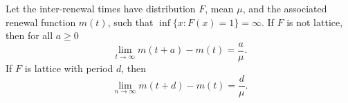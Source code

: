 \documentclass[a4paper,10pt,english]{article}
\begin{document}
\begin{thm} 
Let the inter-renewal times have distribution $F$, mean $\mu$, and the associated renewal function $m(t)$, such that $\inf\{x: F(x) = 1\} = \infty$. 
If $F$ is not lattice, then for all $a \geq 0$
\begin{equation*}
\lim_{t \to \infty} m(t+a) -m(t) = \frac{a}{\mu}.
\end{equation*}
If $F$ is lattice with period $d$, then 
\begin{equation*}
\lim_{n \to \infty} m(t+d) - m(t) = \frac{d}{\mu}.
\end{equation*}
\end{thm}
\end{document}
